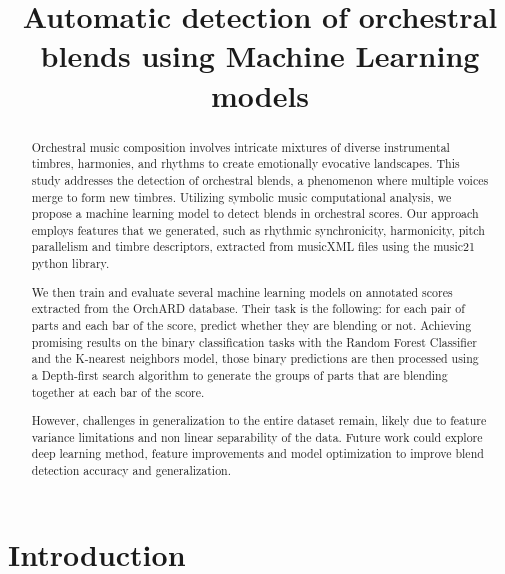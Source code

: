 \documentclass{article}
\title{Automatic detection of orchestral blends using Machine Learning models}
\begin{document}
%
\maketitle
%
\begin{abstract}

Orchestral music composition involves intricate mixtures of diverse instrumental timbres, harmonies, and rhythms to create emotionally evocative landscapes.
  This study addresses the detection of orchestral blends, a phenomenon where multiple voices merge to form new timbres.
  Utilizing symbolic music computational analysis, we propose a machine learning model to detect blends in orchestral scores.
  Our approach employs features that we generated, such as rhythmic synchronicity, harmonicity, pitch parallelism and timbre descriptors, 
  extracted from musicXML files using the music21 python library.

  We then train and evaluate several machine learning models on annotated scores extracted from the OrchARD database.
  Their task is the following: for each pair of parts and each bar of the score, predict whether they are blending or not.
  Achieving promising results on the binary classification tasks with the Random Forest Classifier and the K-nearest neighbors model,
  those binary predictions are then processed using a Depth-first search algorithm to generate the groups of parts that are blending together at each bar of the score.

  However, challenges in generalization to the entire dataset remain, likely due to feature variance limitations and non linear separability of the data.
  Future work could explore deep learning method, feature improvements and model optimization to improve blend detection accuracy and generalization.

\end{abstract}
%
\section{Introduction}\label{sec:introduction}
\end{document}
